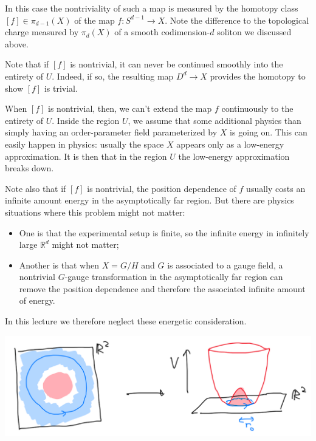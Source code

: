 \documentclass[12pt]{article}
\numberwithin{equation}{section}
\numberwithin{figure}{section}
\theoremstyle{remark}
\renewenvironment{figure}[1][]{
  \begin{originalfigure}[#1]
    \begin{mdframed}[linecolor=black!0,backgroundcolor=black!1]
}{
    \end{mdframed}
  \end{originalfigure}
}
\def\bR{\mathbb{R}}
\begin{document}
In this case the nontriviality of such a map is measured by the homotopy class $[f]\in \pi_{d-1}(X)$
of the map $f: S^{d-1}\to X$.
Note the difference to the topological charge measured by  $\pi_d(X)$ of a smooth codimension-$d$ soliton
we discussed above.

Note that if $[f]$ is nontrivial,
it can never be continued smoothly into the entirety of $U$.
Indeed, if so, the resulting map $D^{d}\to X$ provides the homotopy to show $[f]$ is trivial.

When $[f]$ is nontrivial, then, we can't extend the map $f$ continuously to the entirety of $U$.
Inside the region $U$, we assume that some additional physics than 
simply having an order-parameter field parameterized by $X$ is going on.
This can easily happen in physics: usually the space $X$ appears only as a low-energy approximation.
It is then  that in the region $U$ the low-energy approximation breaks down.

Note also that if $[f]$ is nontrivial,
the position dependence of $f$ usually costs an infinite amount energy in the asymptotically far region.
But there are physics situations where this problem might not matter:
\begin{itemize}
\item One is that the experimental setup is finite, so the infinite energy in infinitely large $\bR^d$ might not matter;
\item Another is that when $X=G/H$ and $G$ is associated to a gauge field,
a nontrivial $G$-gauge transformation in the asymptotically far region can remove the position dependence
and therefore the associated infinite amount of energy.
\end{itemize}
In this lecture we therefore neglect these energetic consideration.

\begin{figure}[h]
\centering
\includegraphics[width=.7\textwidth]{vortex.png}
\caption{A vortex configuration. 
In the asymptotic region, the field values are at the bottom of the potential.
In the core region, the field values come to the origin of the field space.}
\label{fig:vortex}
\end{figure}
\end{document}
